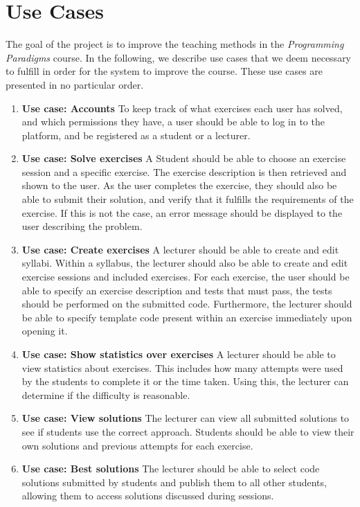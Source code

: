\section{Use Cases} \label{sec:use_cases}
The goal of the project is to improve the teaching methods in the \textit{Programming Paradigms} course.
In the following, we describe use cases that we deem necessary to fulfill in order for the system to improve the course.
These use cases are presented in no particular order.

\begin{enumerate}
    \item \textbf{Use case: Accounts}\newline
    To keep track of what exercises each user has solved, and which permissions they have, a user should be able to log in to the platform, and be registered as a student or a lecturer.
    \item \textbf{Use case: Solve exercises}\newline
    A Student should be able to choose an exercise session and a specific exercise. The exercise description is then retrieved and shown to the user.
    As the user completes the exercise, they should also be able to submit their solution, and verify that it fulfills the requirements of the exercise. If this is not the case, an error message should be displayed to the user describing the problem.

    \item \textbf{Use case: Create exercises}\newline
    A lecturer should be able to create and edit syllabi.
    Within a syllabus, the lecturer should also be able to create and edit exercise sessions and included exercises.
    For each exercise, the user should be able to specify an exercise description and tests that must pass, the tests should be performed on the submitted code. Furthermore, the lecturer should be able to specify template code present within an exercise immediately upon opening it.

    \item \textbf{Use case: Show statistics over exercises} \newline
    A lecturer should be able to view statistics about exercises.
    This includes how many attempts were used by the students to complete it or the time taken.
    Using this, the lecturer can determine if the difficulty is reasonable.

    \item \textbf{Use case: View solutions}\newline
    The lecturer can view all submitted solutions to see if students use the correct approach.
    Students should be able to view their own solutions and previous attempts for each exercise.

    \item \textbf{Use case: Best solutions}\newline
    The lecturer should be able to select code solutions submitted by students and publish them to all other students, allowing them to access solutions discussed during sessions.

\end{enumerate}


